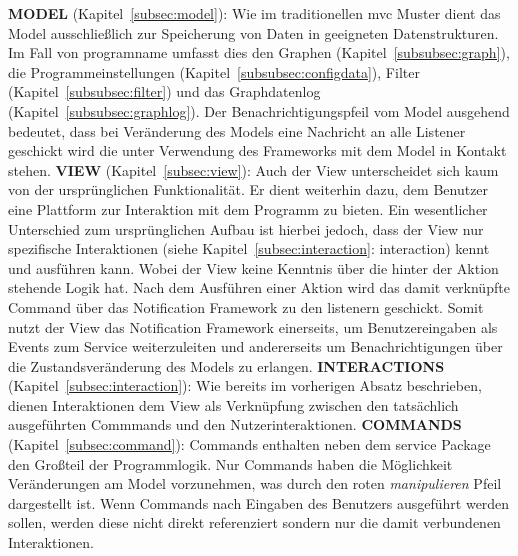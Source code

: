 \textbf{MODEL} (Kapitel~\ref{subsec:model}):\newline
Wie im traditionellen \gls{mvc} Muster dient das Model ausschließlich zur Speicherung von Daten in geeigneten Datenstrukturen. Im Fall von \gls{programname} umfasst dies den Graphen (Kapitel~\ref{subsubsec:graph}), die Programmeinstellungen (Kapitel~\ref{subsubsec:configdata}), Filter (Kapitel~\ref{subsubsec:filter}) und das Graphdatenlog (Kapitel~\ref{subsubsec:graphlog}). Der Benachrichtigungspfeil vom Model ausgehend bedeutet, dass bei Veränderung des Models eine Nachricht an alle Listener geschickt wird die unter Verwendung des Frameworks mit dem Model in Kontakt stehen.\newline
 \newline
\textbf{VIEW} (Kapitel~\ref{subsec:view}):\newline
Auch der View unterscheidet sich kaum von der ursprünglichen Funktionalität. Er dient weiterhin dazu, dem Benutzer eine Plattform zur Interaktion mit dem Programm zu bieten. Ein wesentlicher Unterschied zum ursprünglichen Aufbau ist hierbei jedoch, dass der View nur spezifische Interaktionen (siehe Kapitel~\ref{subsec:interaction}: interaction) kennt und ausführen kann. Wobei der View keine Kenntnis über die hinter der Aktion stehende Logik hat. Nach dem Ausführen einer Aktion wird das damit verknüpfte Command über das Notification Framework zu den \gls{listener}n geschickt. Somit nutzt der View das Notification Framework einerseits, um Benutzereingaben als Events zum Service weiterzuleiten und andererseits um Benachrichtigungen über die Zustandsveränderung des Models zu erlangen.\newline
 \newline
\textbf{INTERACTIONS} (Kapitel~\ref{subsec:interaction}):\newline
Wie bereits im vorherigen Absatz beschrieben, dienen Interaktionen dem View als Verknüpfung zwischen den tatsächlich ausgeführten Commmands und den Nutzerinteraktionen.\newline
 \newline
\textbf{COMMANDS} (Kapitel~\ref{subsec:command}):\newline
Commands enthalten neben dem service Package den Großteil der Programmlogik. Nur Commands haben die Möglichkeit Veränderungen am Model vorzunehmen, was durch den roten \textit{manipulieren} Pfeil dargestellt ist. Wenn Commands nach Eingaben des Benutzers ausgeführt werden sollen, werden diese nicht direkt referenziert sondern nur die damit verbundenen Interaktionen.\newline
